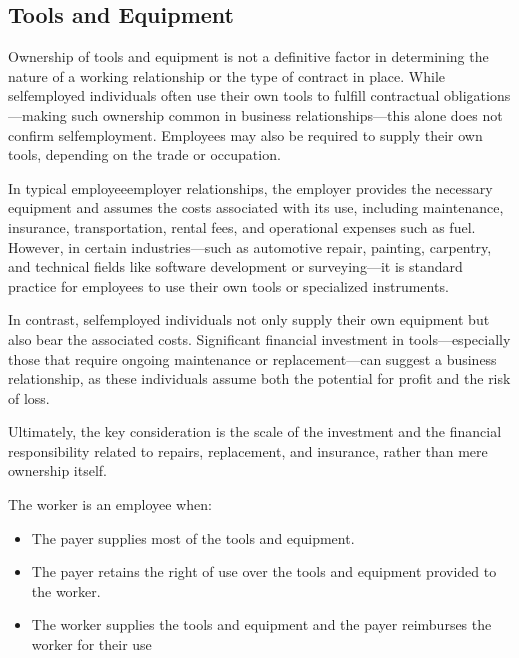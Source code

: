 \documentclass[letterpaper,10pt,english]{sphinxmanual}
\begin{document}
\subsection{Tools and Equipment}
\label{\detokenize{compliance:tools-and-equipment}}
\sphinxAtStartPar
Ownership of tools and equipment is not a definitive factor in determining the nature of a working relationship or the type
of contract in place. While self\sphinxhyphen{}employed individuals often use their own tools to fulfill contractual obligations—making
such ownership common in business relationships—this alone does not confirm self\sphinxhyphen{}employment. Employees may also be required
to supply their own tools, depending on the trade or occupation.

\sphinxAtStartPar
In typical employee\sphinxhyphen{}employer relationships, the employer provides the necessary equipment and assumes the costs associated
with its use, including maintenance, insurance, transportation, rental fees, and operational expenses such as fuel. However,
in certain industries—such as automotive repair, painting, carpentry, and technical fields like software development or
surveying—it is standard practice for employees to use their own tools or specialized instruments.

\sphinxAtStartPar
In contrast, self\sphinxhyphen{}employed individuals not only supply their own equipment but also bear the associated costs. Significant
financial investment in tools—especially those that require ongoing maintenance or replacement—can suggest a business
relationship, as these individuals assume both the potential for profit and the risk of loss.

\sphinxAtStartPar
Ultimately, the key consideration is the scale of the investment and the financial responsibility related to repairs,
replacement, and insurance, rather than mere ownership itself.

\sphinxAtStartPar
The worker is an employee when:
\begin{itemize}
\item {} 
\sphinxAtStartPar
The payer supplies most of the tools and equipment.

\item {} 
\sphinxAtStartPar
The payer retains the right of use over the tools and equipment provided to the worker.

\item {} 
\sphinxAtStartPar
The worker supplies the tools and equipment and the payer reimburses the worker for their use

\end{itemize}
\end{document}
